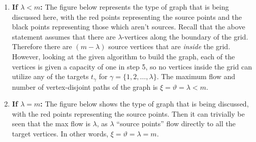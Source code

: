 \documentclass[addpoints]{exam}
\begin{document}
\begin{questions}
\begin{solution}
\begin{enumerate}
\itemsep-0.5em
\item {\bf If $\lambda < m$:} The figure below represents the type of graph that is being discussed here, with the red points representing the source points and the black points representing those which aren't sources. Recall that the above statement assumes that there are $\lambda$-vertices along the boundary of the grid. Therefore there are $(m - \lambda)$ source vertices that are {\em inside} the grid. However, looking at the given algorithm to build the graph, each of the vertices is given a capacity of one in step 5, so no vertices inside the grid can utilize any of the targets $t_{\gamma}$ for $\gamma=\{1,2,\ldots,\lambda\}$. The maximum flow and number of vertex-disjoint paths of the graph is $\xi = \vartheta = \lambda < m$. 

\begin{center}
\end{center}

\item {\bf If $\lambda = m$:} The figure below shows the type of graph that is being discussed, with the red points representing the source points.  Then it can trivially be seen that the max flow is $\lambda$, as $\lambda$ ``source points'' flow directly to all the target vertices. In other words, $\xi = \vartheta = \lambda = m$. 

\begin{center}
\end{center}
\end{enumerate}
\end{solution}
\end{questions}
\end{document}
